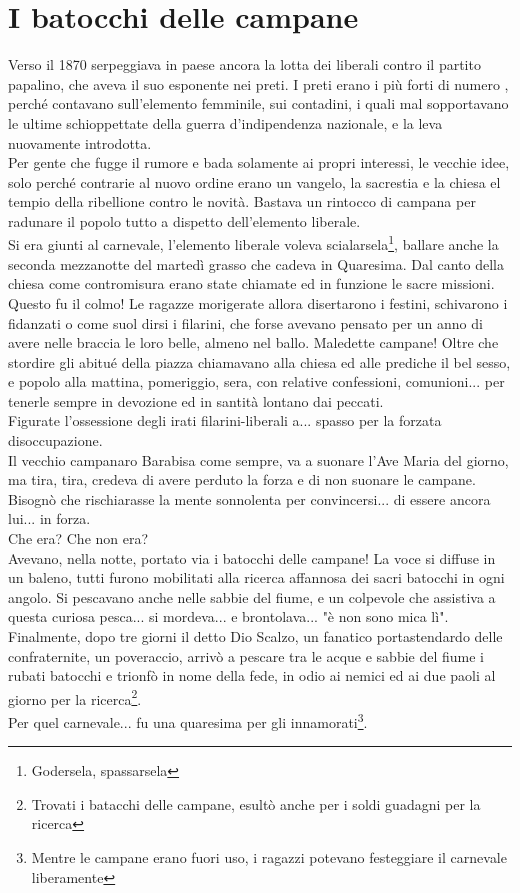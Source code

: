 \documentclass[10pt]{memoir} %
\begin{document}
\chapter{I batocchi delle campane}
Verso il 1870 serpeggiava in paese ancora la lotta dei liberali contro il partito papalino, che aveva il suo esponente nei preti. I preti erano i più forti di numero , perché contavano sull'elemento femminile, sui contadini, i quali mal sopportavano le ultime schioppettate della guerra d'indipendenza nazionale, e la leva nuovamente introdotta.\\
Per gente che fugge il rumore e bada solamente ai propri interessi, le vecchie idee, solo perché contrarie al nuovo ordine erano un vangelo, la sacrestia e la chiesa el tempio della ribellione contro le novità. Bastava un rintocco di campana per radunare il popolo tutto a dispetto dell'elemento liberale. \\
Si era giunti al carnevale, l'elemento liberale voleva scialarsela\footnote{Godersela, spassarsela}, ballare anche la seconda mezzanotte del martedì grasso che cadeva in Quaresima. Dal canto della chiesa come contromisura erano state chiamate ed in funzione le sacre missioni. Questo fu il colmo! Le ragazze morigerate allora disertarono i festini, schivarono i fidanzati o come suol dirsi i filarini, che forse avevano pensato per un anno di avere nelle braccia le loro belle, almeno nel ballo. Maledette campane! Oltre che stordire gli abitué della piazza chiamavano alla chiesa ed alle prediche il bel sesso, e popolo alla mattina, pomeriggio, sera, con relative confessioni, comunioni... per tenerle sempre in devozione ed in santità lontano dai peccati. \\
Figurate l'ossessione degli irati filarini-liberali a... spasso per la forzata disoccupazione.\\
Il vecchio campanaro Barabisa come sempre, va a suonare l'Ave Maria del giorno, ma tira, tira, credeva di avere perduto la forza e di non suonare le campane. Bisognò che rischiarasse la mente sonnolenta per convincersi... di essere ancora lui... in forza.\\
Che era? Che non era?\\
Avevano, nella notte, portato via i batocchi delle campane! La voce si diffuse in un baleno, tutti furono mobilitati alla ricerca affannosa dei sacri batocchi in ogni angolo. Si pescavano anche nelle sabbie del fiume, e un colpevole che assistiva a questa curiosa pesca... si mordeva... e brontolava... "è non sono mica lì".\\
Finalmente, dopo tre giorni il detto Dio Scalzo, un fanatico portastendardo delle confraternite, un poveraccio, arrivò a pescare tra le acque e sabbie del fiume i rubati batocchi e trionfò in nome della fede, in odio ai nemici ed ai due paoli al giorno per la ricerca\footnote{Trovati i batacchi delle campane, esultò anche per i soldi guadagni per la ricerca}.\\
Per quel carnevale... fu una quaresima per gli innamorati\footnote{Mentre le campane erano fuori uso, i ragazzi potevano festeggiare il carnevale liberamente}.
\end{document}
